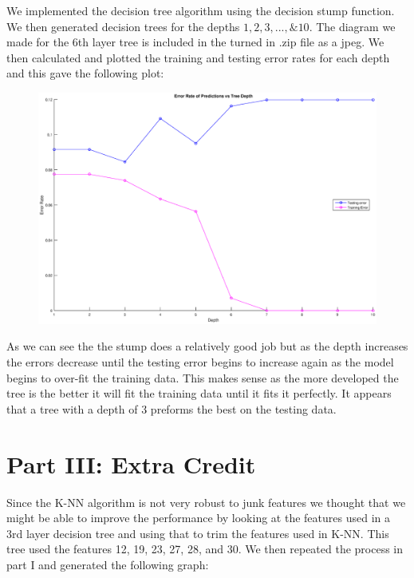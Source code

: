 \documentclass{article}
\begin{document}
	We implemented the decision tree algorithm using the decision stump function. We then generated decision trees for the depths $1, 2, 3, ..., \& 10$. The diagram we made for the 6th layer tree is included in the turned in .zip file as a jpeg. We then calculated and plotted the training and testing error rates for each depth and this gave the following plot:
	
	
	\begin{figure}[h!]
		\begin{center} 
			\includegraphics[scale=0.4]{depth.eps} 
		\end{center} 
		\label{fig:M2}
	\end{figure}
	
	\newpage
	
	As we can see the the stump does a relatively good job but as the depth increases the errors decrease until the testing error begins to increase again as the model begins to over-fit the training data. This makes sense as the more developed the tree is the better it will fit the training data until it fits it perfectly. It appears that a tree with a depth of 3 preforms the best on the testing data.
	
	\section*{Part III: Extra Credit}
	

	

	
	Since the K-NN algorithm is not very robust to junk features we thought that we might be able to improve the performance by looking at the features used in a 3rd layer decision tree and using that to trim the features used in K-NN. This tree used the features 12, 19, 23, 27, 28, and 30. We then repeated the process in part I and generated the following graph:
	
\end{document}
